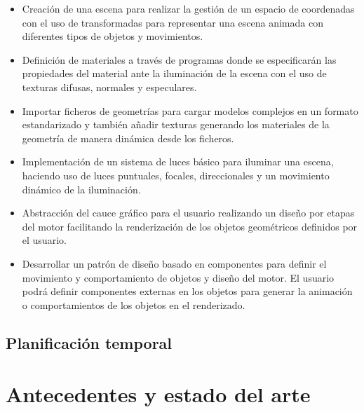 \documentclass[a4paper, 17pt]{book}
\begin{document}
\begin{itemize}
  \item Creación de una escena para realizar la gestión de un espacio de coordenadas con el uso de
  transformadas para representar una escena animada con diferentes tipos de objetos y movimientos.
  
  \item Definición de materiales a través de programas donde se especificarán las propiedades del
  material ante la iluminación de la escena con el uso de texturas difusas, normales y especulares.
  
  \item Importar ficheros de geometrías para cargar modelos complejos en un formato estandarizado
  y también añadir texturas generando los materiales de la geometría de manera dinámica desde los ficheros.
  
  \item Implementación de un sistema de luces básico para iluminar una escena, haciendo uso de luces
  puntuales, focales, direccionales y un movimiento dinámico de la iluminación.
  
  \item Abstracción del cauce gráfico para el usuario realizando un diseño por etapas del motor
  facilitando la renderización de los objetos geométricos definidos por el usuario.
  
  \item Desarrollar un patrón de diseño basado en componentes para definir el movimiento y
  comportamiento de objetos y diseño del motor. El usuario podrá definir componentes 
  externas en los objetos para generar la animación o comportamientos de los objetos en el renderizado.

\end{itemize}

\section{Planificación temporal}
\label{sec:planificacion-temporal}




\cleardoublepage
\chapter{Antecedentes y estado del arte}
\end{document}
